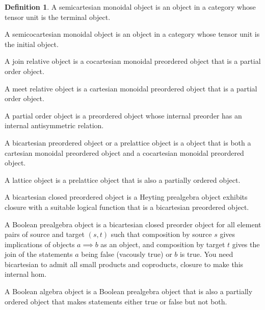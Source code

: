 \documentclass[10pt]{article}
\theoremstyle{plain}%
\theoremstyle{definition}
\newtheorem{definition}{Definition}[section]
\theoremstyle{remark}
\begin{document}
\begin{definition}
    A semicartesian monoidal object is an object in a category whose tensor unit is the terminal object.

    A semicocartesian monoidal object is an object in a category whose tensor unit is the initial object.

    A join relative object is a cocartesian monoidal preordered object that is a partial order object.

    A meet relative object is a cartesian monoidal preordered object that is a partial order object.

    A partial order object is a preordered object whose internal preorder has an internal antisymmetric relation.

    A bicartesian preordered object or a prelattice object is a object that is both a cartesian monoidal preordered object and a cocartesian monoidal preordered object.

    A lattice object is a prelattice object that is also a partially ordered object.

    A bicartesian closed preordered object is a Heyting prealgebra object exhibits closure with a suitable logical function that is a bicartesian preordered object.

    A Boolean prealgebra object is a bicartesian closed preorder object for all element pairs of source and target $(s,t)$ such that composition by source $s$ gives implications of objects $a \implies b$ as an object, and composition by target $t$ gives the join of the statements $a$ being false (vacously true) or $b$ is true. You need bicartesian to admit all small products and coproducts, closure to make this internal hom.

    A Boolean algebra object is a Boolean prealgebra object that is also a partially ordered object that makes statements either true or false but not both.
\end{definition}
\end{document}
